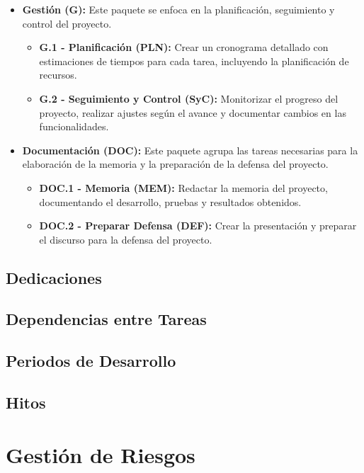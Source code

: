 \begin{itemize}
    \item \textbf{Gestión (G):}
          Este paquete se enfoca en la planificación, seguimiento y control del proyecto.
          \begin{itemize}
              \item \textbf{G.1 - Planificación (PLN):} Crear un cronograma detallado con estimaciones de tiempos para cada tarea, incluyendo la planificación de recursos.
              \item \textbf{G.2 - Seguimiento y Control (SyC):} Monitorizar el progreso del proyecto, realizar ajustes según el avance y documentar cambios en las funcionalidades.
          \end{itemize}

    \item \textbf{Documentación (DOC):}
          Este paquete agrupa las tareas necesarias para la elaboración de la memoria y la preparación de la defensa del proyecto.
          \begin{itemize}
              \item \textbf{DOC.1 - Memoria (MEM):} Redactar la memoria del proyecto, documentando el desarrollo, pruebas y resultados obtenidos.
              \item \textbf{DOC.2 - Preparar Defensa (DEF):} Crear la presentación y preparar el discurso para la defensa del proyecto.
          \end{itemize}
\end{itemize}


\subsection{Dedicaciones}
\subsection{Dependencias entre Tareas}
\subsection{Periodos de Desarrollo}
\subsection{Hitos}






\section{Gestión de Riesgos}

